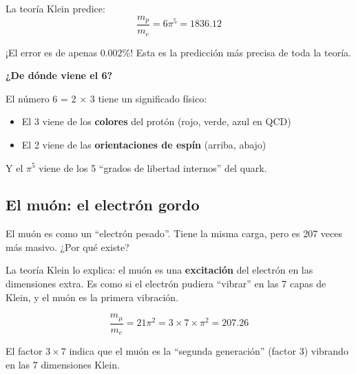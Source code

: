 \documentclass[12pt,a4paper,openany]{book}
\begin{document}
\begin{nivelnarrativo}
La teoría Klein predice:
\begin{equation}
    \frac{m_p}{m_e} = 6\pi^5 = 1836.12
\end{equation}

¡El error es de apenas 0.002\%! Esta es la predicción más precisa de toda la teoría.

\begin{analogiabox}
\textbf{¿De dónde viene el 6?}

El número 6 = 2 $\times$ 3 tiene un significado físico:
\begin{itemize}
    \item El 3 viene de los \textbf{colores} del protón (rojo, verde, azul en QCD)
    \item El 2 viene de las \textbf{orientaciones de espín} (arriba, abajo)
\end{itemize}

Y el $\pi^5$ viene de los 5 ``grados de libertad internos'' del quark.
\end{analogiabox}

\subsection*{El muón: el electrón gordo}

El muón es como un ``electrón pesado''. Tiene la misma carga, pero es 207 veces más masivo. ¿Por qué existe?

La teoría Klein lo explica: el muón es una \textbf{excitación} del electrón en las dimensiones extra. Es como si el electrón pudiera ``vibrar'' en las 7 capas de Klein, y el muón es la primera vibración.

\begin{equation}
    \frac{m_\mu}{m_e} = 21\pi^2 = 3 \times 7 \times \pi^2 = 207.26
\end{equation}

El factor $3 \times 7$ indica que el muón es la ``segunda generación'' (factor 3) vibrando en las 7 dimensiones Klein.

\end{nivelnarrativo}
\end{document}
